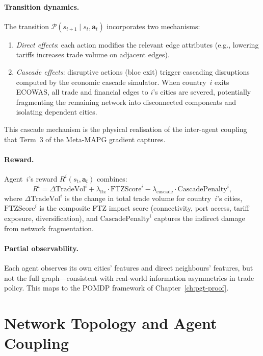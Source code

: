 \paragraph{Transition dynamics.} The transition $\mathcal{P}(s_{t+1} \mid s_t, \mathbf{a}_t)$ incorporates two mechanisms:
\begin{enumerate}
  \item \emph{Direct effects}: each action modifies the relevant edge attributes (e.g., lowering tariffs increases trade volume on adjacent edges).
  \item \emph{Cascade effects}: disruptive actions (bloc exit) trigger cascading disruptions computed by the economic cascade simulator. When country~$i$ exits ECOWAS, all trade and financial edges to $i$'s cities are severed, potentially fragmenting the remaining network into disconnected components and isolating dependent cities.
\end{enumerate}

This cascade mechanism is the physical realisation of the inter-agent coupling that Term~3 of the Meta-MAPG gradient captures.

\paragraph{Reward.} Agent~$i$'s reward $R^i(s_t, \mathbf{a}_t)$ combines:
\begin{equation}
  R^i = \Delta\text{TradeVol}^i + \lambda_{\text{ftz}} \cdot \text{FTZScore}^i - \lambda_{\text{cascade}} \cdot \text{CascadePenalty}^i,
\end{equation}
where $\Delta\text{TradeVol}^i$ is the change in total trade volume for country~$i$'s cities, $\text{FTZScore}^i$ is the composite FTZ impact score (connectivity, port access, tariff exposure, diversification), and $\text{CascadePenalty}^i$ captures the indirect damage from network fragmentation.

\paragraph{Partial observability.} Each agent observes its own cities' features and direct neighbours' features, but not the full graph---consistent with real-world information asymmetries in trade policy. This maps to the POMDP framework of Chapter~\ref{ch:pgt-proof}.

\section{Network Topology and Agent Coupling}
\label{sec:network-coupling}

